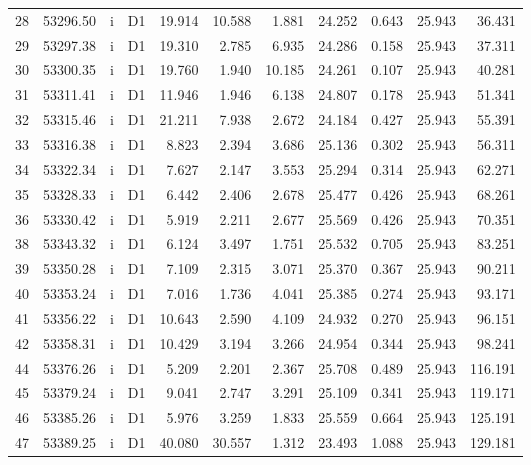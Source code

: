\begin{tabular}{lrllrrrrrrr}
28 &  53296.50 &   i &    D1 &   19.914 &      10.588 &   1.881 &  24.252 &   0.643 &  25.943 &   36.431 \\
29 &  53297.38 &   i &    D1 &   19.310 &       2.785 &   6.935 &  24.286 &   0.158 &  25.943 &   37.311 \\
30 &  53300.35 &   i &    D1 &   19.760 &       1.940 &  10.185 &  24.261 &   0.107 &  25.943 &   40.281 \\
31 &  53311.41 &   i &    D1 &   11.946 &       1.946 &   6.138 &  24.807 &   0.178 &  25.943 &   51.341 \\
32 &  53315.46 &   i &    D1 &   21.211 &       7.938 &   2.672 &  24.184 &   0.427 &  25.943 &   55.391 \\
33 &  53316.38 &   i &    D1 &    8.823 &       2.394 &   3.686 &  25.136 &   0.302 &  25.943 &   56.311 \\
34 &  53322.34 &   i &    D1 &    7.627 &       2.147 &   3.553 &  25.294 &   0.314 &  25.943 &   62.271 \\
35 &  53328.33 &   i &    D1 &    6.442 &       2.406 &   2.678 &  25.477 &   0.426 &  25.943 &   68.261 \\
36 &  53330.42 &   i &    D1 &    5.919 &       2.211 &   2.677 &  25.569 &   0.426 &  25.943 &   70.351 \\
38 &  53343.32 &   i &    D1 &    6.124 &       3.497 &   1.751 &  25.532 &   0.705 &  25.943 &   83.251 \\
39 &  53350.28 &   i &    D1 &    7.109 &       2.315 &   3.071 &  25.370 &   0.367 &  25.943 &   90.211 \\
40 &  53353.24 &   i &    D1 &    7.016 &       1.736 &   4.041 &  25.385 &   0.274 &  25.943 &   93.171 \\
41 &  53356.22 &   i &    D1 &   10.643 &       2.590 &   4.109 &  24.932 &   0.270 &  25.943 &   96.151 \\
42 &  53358.31 &   i &    D1 &   10.429 &       3.194 &   3.266 &  24.954 &   0.344 &  25.943 &   98.241 \\
44 &  53376.26 &   i &    D1 &    5.209 &       2.201 &   2.367 &  25.708 &   0.489 &  25.943 &  116.191 \\
45 &  53379.24 &   i &    D1 &    9.041 &       2.747 &   3.291 &  25.109 &   0.341 &  25.943 &  119.171 \\
46 &  53385.26 &   i &    D1 &    5.976 &       3.259 &   1.833 &  25.559 &   0.664 &  25.943 &  125.191 \\
47 &  53389.25 &   i &    D1 &   40.080 &      30.557 &   1.312 &  23.493 &   1.088 &  25.943 &  129.181 \\

\end{tabular}
